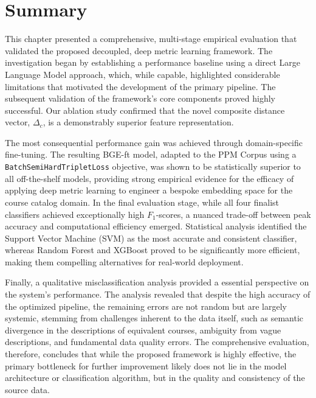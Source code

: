 \section{Summary}\label{ch:4.7}
This chapter presented a comprehensive, multi-stage empirical evaluation that validated the proposed decoupled, deep metric learning framework. The investigation began by establishing a performance baseline using a direct Large Language Model approach, which, while capable, highlighted considerable limitations that motivated the development of the primary pipeline. The subsequent validation of the framework's core components proved highly successful. Our ablation study confirmed that the novel composite distance vector, \(\Delta_c\), is a demonstrably superior feature representation.

The most consequential performance gain was achieved through domain-specific fine-tuning. The resulting BGE-ft model, adapted to the PPM Corpus using a \verb|BatchSemiHardTripletLoss| objective, was shown to be statistically superior to all off-the-shelf models, providing strong empirical evidence for the efficacy of applying deep metric learning to engineer a bespoke embedding space for the course catalog domain. In the final evaluation stage, while all four finalist classifiers achieved exceptionally high \(F_1\)-scores, a nuanced trade-off between peak accuracy and computational efficiency emerged. Statistical analysis identified the Support Vector Machine (SVM) as the most accurate and consistent classifier, whereas Random Forest and XGBoost proved to be significantly more efficient, making them compelling alternatives for real-world deployment.{\setlength{\emergencystretch}{5em}\par}

Finally, a qualitative misclassification analysis provided a essential perspective on the system's performance. The analysis revealed that despite the high accuracy of the optimized pipeline, the remaining errors are not random but are largely systemic, stemming from challenges inherent to the data itself, such as semantic divergence in the descriptions of equivalent courses, ambiguity from vague descriptions, and fundamental data quality errors. The comprehensive evaluation, therefore, concludes that while the proposed framework is highly effective, the primary bottleneck for further improvement likely does not lie in the model architecture or classification algorithm, but in the quality and consistency of the source data.
